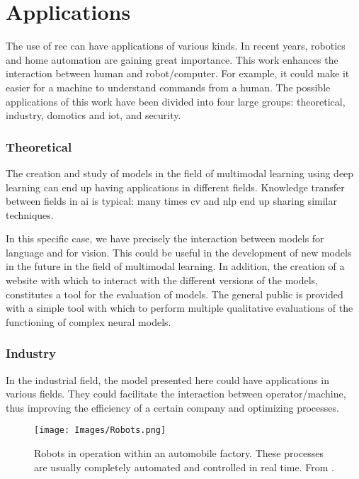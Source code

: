 \section{Applications}\label{sec:applications}

The use of \gls{rec} can have applications of various kinds. In recent years,
robotics and home automation are gaining great importance. This work enhances
the interaction between human and robot/computer. For example, it could make it
easier for a machine to understand commands from a human. The possible
applications of this work have been divided into four large groups:
theoretical, industry, domotics and \acs{iot}, and security.

\subsubsection{Theoretical}

The creation and study of models in the field of multimodal
learning using deep learning can end up having
applications in different fields. Knowledge transfer between fields in \gls{ai}
is typical: many times \gls{cv} and \gls{nlp} end up sharing similar
techniques.

In this specific case, we have precisely the interaction between models for
language and for vision. This could be useful in the development of new models
in the future in the field of multimodal
learning. In addition, the creation of a website
with which to interact with the different versions of the models, constitutes a
tool for the evaluation of models. The general public is provided with a simple
tool with which to perform multiple qualitative evaluations of the functioning
of complex neural models.

\subsubsection{Industry}

In the industrial field, the model presented here could have applications in
various fields. They could facilitate the interaction between operator/machine,
thus improving the efficiency of a certain company and optimizing processes.

\begin{figure}[ht]
  \centering
  \texttt{[image: Images/Robots.png]}
  \caption[Robots in automobile factory]{Robots in operation within an
    automobile factory. These processes are usually completely automated and
    controlled in real time. From
    .}\label{fig:robots}
\end{figure}

